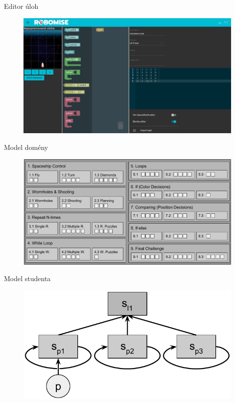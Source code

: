 \documentclass[
]{beamer}
\begin{document}
\begin{frame}{Editor úloh}
\begin{figure}
\includegraphics[width=\textwidth,height=.75\textheight,keepaspectratio]{../img/task-editor}
\end{figure}
\end{frame}


\begin{frame}{Model domény}
\begin{figure}
\includegraphics[width=\textwidth,height=.75\textheight,keepaspectratio]{../img/robomission-domain}
\end{figure}
\end{frame}

\begin{frame}{Model studenta}
\begin{figure}
\includegraphics[width=\textwidth,height=.45\textheight,keepaspectratio]{../img/robomission-student-model}
\end{figure}
\end{frame}
\end{document}
